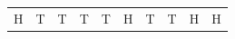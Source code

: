 {{\begin{center}
\begin{xtabular}[t]{|l|l|l|l|l|l|l|l|l|l|}
    
        H &
    
    
        T &
    
    
        T &
    
    
        T &
    
    
        T &
    
    
        H &
    
    
        T &
    
    
        T &
    
    
        H &
    
    
        H%
     \tabularnewline{}
    

\end{xtabular}
\end{center}}}
